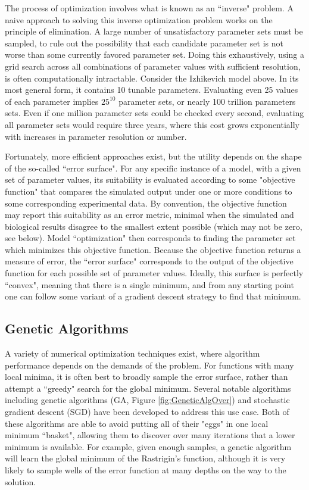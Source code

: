 The process of optimization involves what is known as an ``inverse" problem.
A naive approach to solving this inverse optimization problem works on the principle of elimination.
A large number of unsatisfactory parameter sets must be sampled, to rule out the possibility that each candidate parameter set is not worse than some currently favored parameter set.
Doing this exhaustively, using a grid search across all combinations of parameter values with sufficient resolution, is often  computationally intractable.
Consider the Izhikevich model above.
In its most general form, it contains 10 tunable parameters.
Evaluating even 25 values of each parameter implies $25^10$ parameter sets, or nearly 100 trillion parameters sets.
Even if one million parameter sets could be checked every second, evaluating all parameter sets would require three years, where this cost grows exponentially with increases in parameter resolution or number.

Fortunately, more efficient approaches exist, but the utility depends on the shape of the so-called ``error surface".
For any specific instance of a model, with a given set of parameter values, its suitability is evaluated according to some "objective function" that compares the simulated output under one or more conditions to some corresponding experimental data.
By convention, the objective function may report this suitability as an error metric, minimal when the simulated and biological results disagree to the smallest extent possible (which may not be zero, see below).
Model ``optimization" then corresponds to finding the parameter set which minimizes this objective function. 
Because the objective function returns a measure of error, the ``error surface" corresponds to the output of the objective function for each possible set of parameter values.
Ideally, this surface is perfectly ``convex", meaning that there is a single minimum, and from any starting point one can follow some variant of a gradient descent strategy to find that minimum.  

\subsection{Genetic Algorithms}
\label{sec:genetic-algorithms}
A variety of numerical optimization techniques exist, where algorithm performance depends on the demands of the problem.
For functions with many local minima, it is often best to broadly sample the error surface, rather than attempt a ``greedy" search for the global minimum.
Several notable algorithms including genetic algorithms (GA, Figure \ref{fig:GeneticAlgOver}) and stochastic gradient descent (SGD) have been developed to address this use case.
Both of these algorithms are able to avoid putting all of their "eggs" in one local minimum ``basket", allowing them to discover over many iterations that a lower minimum is available.
For example, given enough samples, a genetic algorithm will learn the global minimum of the Rastrigin's function, although it is very likely to sample wells of the error function at many depths on the way to the solution.

